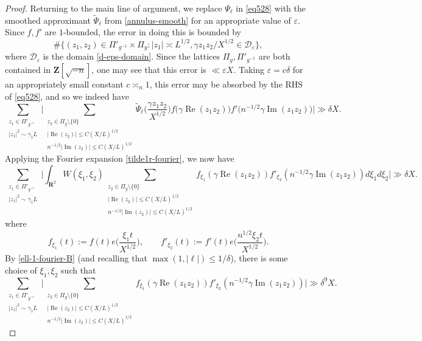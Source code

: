 \documentclass[11pt,reqno]{amsart}
\numberwithin{equation}{section}
\theoremstyle{definition}
\theoremstyle{remark}
\newcommand{\mc}{\mathcal}
\newcommand{\on}{\operatorname}
\newcommand{\eps}{\varepsilon}
\renewcommand{\le}{\leqslant}
\renewcommand{\Re}{\on{Re}}
\renewcommand{\Im}{\on{Im}}
\newcommand\Z{\mathbf{Z}}
\newcommand\R{\mathbf{R}}
\begin{document}
\begin{proof}
Returning to the main line of argument, we replace $\Psi_{\ell}$ in \cref{eq528} with the smoothed approximant $\tilde \Psi_{\ell}$ from \cref{annulus-smooth} for an appropriate value of $\eps$. Since $f, f'$ are $1$-bounded, the error in doing this is bounded by
\[ \# \{ (z_1, z_2) \in \Pi'_{g^{-1}} \times \Pi_g : |z_1| \asymp L^{1/2}, \gamma z_1 z_2/X^{1/2} \in \mc{D}_{\eps}\}, \] where $\mc{D}_{\eps}$ is the domain \cref{d-eps-domain}.
Since the lattices $\Pi_g, \Pi'_{g^{-1}}$ are both contained in $\Z[\sqrt{-n}]$, one may see that this error is $\ll \eps X$. Taking $\eps = c \delta$ for an appropriately small constant $c \asymp_n 1$, this error may be absorbed by the RHS of \cref{eq528}, and so we indeed have 
\begin{equation}\label{eq528-b} \sum_{\substack{z_1 \in \Pi'_{g^{-1}} \\ |z_1|^2 \sim \gamma_1 L}} \Big| \sum_{\substack{z_2 \in \Pi_g \setminus \{0\} \\ |\Re(z_2)| \le  C(X/L)^{1/2} \\  n^{-1/2}|\Im(z_2)| \le C(X/L)^{1/2}}} \tilde\Psi_{\ell}\Big(\frac{\gamma z_1 z_2}{X^{1/2}}\Big) f\big(\gamma \Re (z_1 z_2)\big) f'\big( n^{-1/2}\gamma  \Im ( z_1 z_2)\big) \Big| \gg \delta X. \end{equation}
Applying the Fourier expansion \cref{tilde1r-fourier}, we now have
\[ \sum_{\substack{z_1 \in \Pi'_{g^{-1}} \\ |z_1|^2 \sim \gamma_1 L}} \Big| \int_{\R^2} W(\xi_1, \xi_2) \sum_{\substack{z_2 \in \Pi_g \setminus \{0\} \\ |\Re(z_2)| \le  C(X/L)^{1/2} \\  n^{-1/2}|\Im(z_2)| \le C(X/L)^{1/2}} }f_{\xi_1}(\gamma\Re(z_1 z_2)) f'_{\xi_2}(n^{-1/2}\gamma  \Im ( z_1 z_2) )d\xi_1d\xi_2 \Big|  \gg \delta X. \]
where 
\[ f_{\xi_1}(t) := f(t) e\Big(\frac{\xi_1 t}{X^{1/2}} \Big), \qquad f'_{\xi_2}(t) := f' (t) e\Big(\frac{n^{1/2}  \xi_2 t}{ X^{1/2}} \Big).\]
By \cref{ell-1-fourier-B} (and recalling that $\max(1,|\ell|) \le 1/\delta$), there is some choice of $\xi_1, \xi_2$ such that 
\begin{equation}\label{decoupled} \sum_{\substack{z_1 \in \Pi'_{g^{-1}} \\ |z_1|^2 \sim \gamma_1 L}} \Big|  \sum_{\substack{z_2 \in \Pi_g \setminus \{0\} \\ |\Re(z_2)| \le  C(X/L)^{1/2} \\  n^{-1/2}|\Im(z_2)| \le C(X/L)^{1/2}} } f_{\xi_1}(\gamma\Re(z_1 z_2)) f'_{\xi_2}( n^{-1/2}\gamma \Im ( z_1 z_2) ) \Big|  \gg \delta^9 X. \end{equation}

\end{proof}
\end{document}
